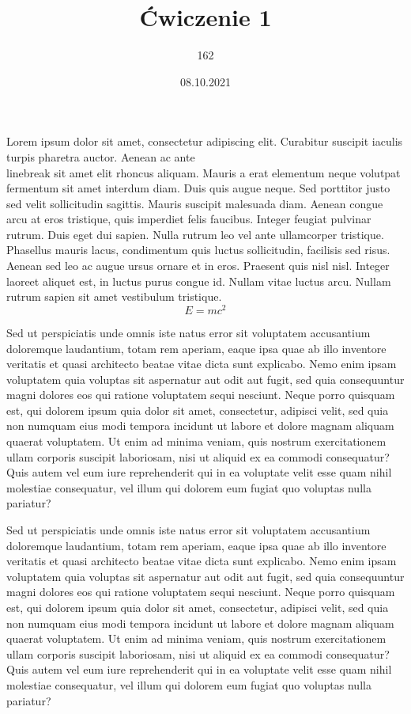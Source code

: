 \documentclass[11pt,a4paper,fleqn,leqno,titlepage]{article}
\title{Ćwiczenie 1}
\author{162}
\date{08.10.2021}
\begin{document}
\maketitle
\tableofcontents
\newpage
Lorem ipsum dolor sit amet, consectetur adipiscing elit. Curabitur suscipit iaculis turpis pharetra auctor. Aenean ac ante \\linebreak
sit amet elit rhoncus aliquam. Mauris a erat elementum neque volutpat fermentum sit amet interdum diam. Duis quis augue neque.
Sed porttitor justo sed velit sollicitudin sagittis. Mauris suscipit malesuada diam. Aenean congue arcu at eros tristique, 
quis imperdiet felis faucibus. \newline Integer feugiat pulvinar rutrum. Duis eget dui sapien. Nulla rutrum leo vel ante ullamcorper 
tristique. Phasellus mauris lacus, condimentum quis luctus sollicitudin, facilisis sed risus. Aenean sed leo ac augue 
ursus ornare et in eros. Praesent quis nisl nisl. Integer laoreet aliquet est, in luctus purus congue id. Nullam 
vitae luctus arcu. Nullam rutrum sapien sit amet vestibulum tristique.
\begin{equation}
E = mc^2
\end{equation}

\clearpage

Sed ut perspiciatis unde omnis iste natus error sit voluptatem accusantium doloremque laudantium, totam rem aperiam, eaque ipsa quae ab illo inventore veritatis et quasi architecto beatae vitae dicta sunt explicabo. Nemo enim ipsam voluptatem quia voluptas sit aspernatur aut odit aut fugit, sed quia consequuntur magni dolores eos qui ratione voluptatem sequi nesciunt. Neque porro quisquam est, qui dolorem ipsum quia dolor sit amet, consectetur, adipisci velit, sed quia non numquam eius modi tempora incidunt ut labore et dolore magnam aliquam quaerat voluptatem. Ut enim ad minima veniam, quis nostrum exercitationem ullam corporis suscipit laboriosam, nisi ut aliquid ex ea commodi consequatur? Quis autem vel eum iure reprehenderit qui in ea voluptate velit esse quam nihil molestiae consequatur, vel illum qui dolorem eum fugiat quo voluptas nulla pariatur?

Sed ut perspiciatis unde omnis iste natus error sit voluptatem accusantium doloremque laudantium, totam rem aperiam, eaque ipsa quae ab illo inventore veritatis et quasi architecto beatae vitae dicta sunt explicabo. Nemo enim ipsam voluptatem quia voluptas sit aspernatur aut odit aut fugit, sed quia consequuntur magni dolores eos qui ratione voluptatem sequi nesciunt. Neque porro quisquam est, qui dolorem ipsum quia dolor sit amet, consectetur, adipisci velit, sed quia non numquam eius modi tempora incidunt ut labore et dolore magnam aliquam quaerat voluptatem. Ut enim ad minima veniam, quis nostrum exercitationem ullam corporis suscipit laboriosam, nisi ut aliquid ex ea commodi consequatur? Quis autem vel eum iure reprehenderit qui in ea voluptate velit esse quam nihil molestiae consequatur, vel illum qui dolorem eum fugiat quo voluptas nulla pariatur?
\end{document}
